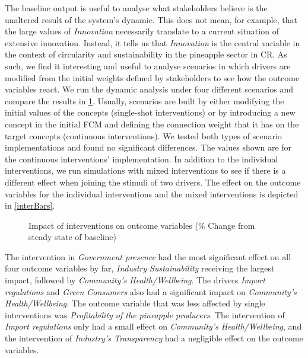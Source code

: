 The baseline output is useful to analyse what stakeholders believe is the unaltered result of the system's dynamic. This does not mean, for example, that the large values of \textit{Innovation} necessarily translate to a current situation of extensive innovation. Instead, it tells us that \textit{Innovation} is the central variable in the context of circularity and sustainability in the pineapple sector in CR. As such, we find it interesting and useful to analyse scenarios in which drivers are modified from the initial weights defined by stakeholders to see how the outcome variables react. We run the dynamic analysis under four different scenarios and compare the results in \cref{interTable}. Usually, scenarios are built by either modifying the initial values of the concepts (single-shot interventions) or by introducing a new concept in the initial FCM and defining the connection weight that it has on the target concepts (continuous interventions). We tested both types of scenario implementations and found no significant differences. The values shown are for the continuous interventions' implementation. In addition to the individual interventions, we run simulations with mixed interventions to see if there is a different effect when joining the stimuli of two drivers. The effect on the outcome variables for the individual interventions and the mixed interventions is depicted in \cref{interBars}.


\begin{figure}[ht]
\caption[Impact of interventions on outcome variables]{Impact of interventions on outcome variables (\% Change from steady state of baseline)} 
\label{interTable}
\centering

\end{figure}


The intervention in \textit{Government presence} had the most significant effect on all four outcome variables by far, \textit{Industry Sustainability} receiving the largest impact, followed by \textit{Community's Health/Wellbeing}. The drivers \textit{Import regulations} and \textit{Green Consumers} also had a significant impact on \textit{Community's Health/Wellbeing}. The outcome variable that was less affected by single interventions was \textit{Profitability of the pineapple producers}. The intervention of \textit{Import regulations} only had a small effect on \textit{Community's Health/Wellbeing}, and the intervention of \textit{Industry's Transparency} had a negligible effect on the outcome variables.  


